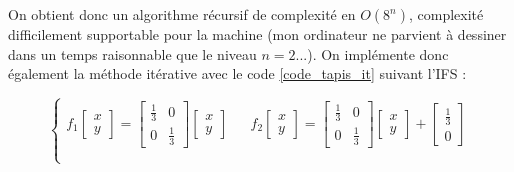 \documentclass[a4paper,10pt]{report}
\begin{document}
\newpage
On obtient donc un algorithme récursif de complexité en $O(8^n)$, complexité difficilement supportable pour la machine (mon ordinateur ne parvient à dessiner dans un temps raisonnable que le niveau $n=2$...). On implémente donc également la méthode itérative avec le code \ref{code_tapis_it} suivant l'IFS :

\begin{equation}
\left\lbrace
\begin{array}{lll}
f_1 \left[ \begin{array}{l} x \\ y \end{array} \right] =
\left[ \begin{array}{ll} \frac{1}{3} & 0 \\ 0 & \frac{1}{3} \end{array} \right]
\left[ \begin{array}{l} x \\ y \end{array} \right]
& &
f_2 \left[ \begin{array}{l} x \\ y \end{array} \right] =
\left[ \begin{array}{ll} \frac{1}{3} & 0 \\ 0 & \frac{1}{3} \end{array} \right]
\left[ \begin{array}{l} x \\ y \end{array} \right]
+ \left[ \begin{array}{l} \frac{1}{3} \\ 0 \end{array} \right]\\ \\


\end{array}
\end{equation}
\end{document}
